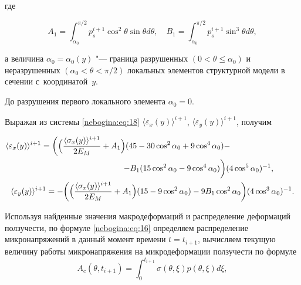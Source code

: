 где

\begin{equation}

A_1= \label{nebogina:eq:19} \int _{\alpha_0}^{\pi/2}

p_s^{i+1} \cos ^2 \theta \sin \theta d \theta, \quad 

B_1=\int_{\alpha_0}^{\pi/2} p_s^{i+1} \sin^3 \theta d \theta,

\end{equation}

а величина $\alpha_0=\alpha_0(y)$ "--- граница разрушенных $(0<\theta \leq \alpha_0)$ и неразрушенных $(\alpha_0 < \theta <\pi/2)$ локальных элементов структурной модели в сечении с~координатой~$y$. 

До разрушения первого локального элемента $\alpha_0=0$.



Выражая из системы \eqref{nebogina:eq:18} $\langle\varepsilon_x

(y)\rangle^{i+1}$, $\langle\varepsilon_y (y)\rangle^{i+1}$, получим

\begin{gather}

\langle \varepsilon_x (y)\rangle^{i+1} =  \biggl( \Bigl( \frac{\langle \sigma_x (y)

\rangle^{i+1}}{2 E_M} + A_1 \Bigr) ( 45 - 30 \cos^2 \alpha_0 + 9 \cos^4 \alpha_0 ) - \hspace{3cm} \\

\hspace{4cm}

-  B_1 ( 15 \cos^2 \alpha_0 - 9 \cos^4 \alpha_0) \biggr) ({4 \cos^5 \alpha_0})^{-1}, 

\label{nebogina:eq:20} 

\\

\langle\varepsilon_y (y)\rangle^{i+1} = - \biggl({ \Bigl( \frac{\langle \sigma_x (y)\rangle^{i+1}}{2 E_M} + A_1 \Bigr) (

15-9 \cos^2 \alpha_0 ) - 9 B_1 \cos^2 \alpha_0}\biggr) ({4 \cos^3 \alpha_0})^{-1}.

\end{gather}



\pagebreak



Используя найденные значения макродеформаций и распределение деформаций ползучести, по формуле \eqref{nebogina:eq:16} определяем распределение микронапряжений в данный момент времени $t = t_{i+1}$,  вычисляем текущую величину работы микронапряжения на микродеформации ползучести  по формуле $$A_c(\theta, t_{i+1})= \int _0^{t_{i+1}} \sigma (\theta, \xi ) p(\theta, \xi )d\xi,$$


